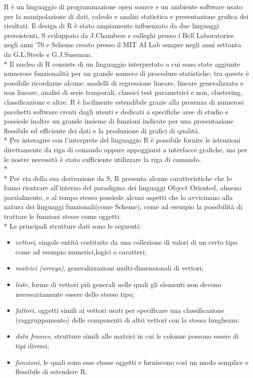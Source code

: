 \documentclass[12pt,a4paper,openright,twoside]{report}
\begin{document}
R è un linguaggio di programmazione open source e un ambiente software usato per la manipolazione di dati, calcolo e analisi statistica e presentazione grafica dei risultati. Il design di R è stato ampiamente influenzato da due linguaggi preesistenti, S sviluppato da J.Chambers e colleghi presso i Bell Laboratories negli anni '70 e Scheme creato presso il MIT AI Lab sempre negli anni settanta da G.L.Steele e G.J.Sussman. \\*
Il nucleo di R consiste di un linguaggio interpretato a cui sono state aggiunte numerose funzionalità per un grande numero di procedure statistiche;  tra queste è possibile ricordarne alcune: modelli di regressione lineare, lineare generalizzata e non lineare, analisi di serie temporali, classici test parametrici e non, clustering, classificazione e altre. R è facilmente estendibile grazie alla presenza di numerosi pacchetti software creati dagli utenti e dedicati a specifiche aree di studio e possiede inoltre un grande insieme di funzioni indicate per una presentazione flessibile ed efficiente dei dati e la produzione di grafici di qualità.\\*
Per interagire con l'interprete del linguaggio R è possibile fornire le istruzioni direttamente da riga di comando oppure appoggiarsi a interfacce grafiche, ma per le nostre necessità è stato sufficiente utilizzare la riga di comando.\\* \\* 
Per via della sua derivazione da S, R presenta alcune caratteristiche che lo fanno rientrare all'interno del paradigma dei linguaggi Object Oriented, almeno parzialmente, e al tempo stesso possiede alcuni aspetti che lo avvicinano alla natura dei linguaggi funzionali(come Scheme), come ad esempio la possibilità di trattare le funzioni stesse come oggetti.\\* Le principali strutture dati sono le seguenti: \begin{itemize}
\item \emph{vettori}, singole entità costituite da una collezione di valori di un certo tipo come ad esempio numerici,logici o caratteri;
\item \emph{matrici (arrays)}, generalizzazioni multi-dimensionali di vettori;
\item \emph{liste}, forme di vettori più generali nelle quali gli elementi non devono necessariamente essere dello stesso tipo;
\item \emph{fattori}, oggetti simili ai vettori usati per specificare una classificazione (raggruppamento) delle componenti di altri vettori con la stessa lunghezza;
\item \emph{data frames}, strutture simili alle matrici in cui le colonne possono essere di tipi diversi;
\item \emph{funzioni}, le quali sono esse stesse oggetti e forniscono così un modo semplice e flessibile di estendere R.
\end{itemize}
\end{document}

